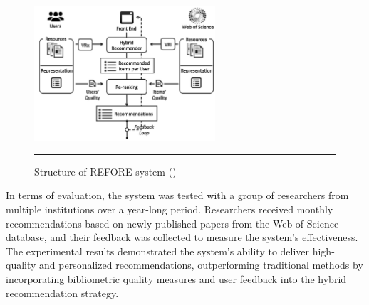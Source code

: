 \begin{figure}[htbp]
    \centering
 \includegraphics[width=0.6\textwidth]{figures/literature-review/refore.png}
     \rule{35em}{0.5pt}
    \caption{Structure of REFORE system (\textcite{refore})}
 \label{fig:refore}
\end{figure}

In terms of evaluation, the system was tested with a group of researchers from multiple institutions over a year-long period.
Researchers received monthly recommendations based on newly published papers from the Web of Science database, and their feedback was collected to measure the system's effectiveness.
The experimental results demonstrated the system's ability to deliver high-quality and personalized recommendations, outperforming traditional methods by incorporating bibliometric quality measures and user feedback into the hybrid recommendation strategy.


